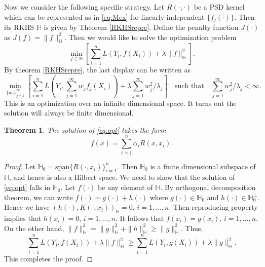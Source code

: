 \documentclass[11pt]{article}
\theoremstyle{plain}
\newtheorem{theorem}{\quad\quad Theorem}
\theoremstyle{definition}
\theoremstyle{remark}
\begin{document}
Now we consider the following specific strategy.
Let $R(\cdot,\cdot)$ be a PSD kernel which can be represented as in \eqref{eq:Mex} for linearly independent $\{f_j(\cdot)\}$.
Then its RKHS $\mathbb H$ is given by Theorem \ref{RKHSrepre}.
Define the penalty function $J(\cdot)$ as $J(f)=\|f\|_{\mathbb H}^2$.
Then we would like to solve the optimization problem
\begin{equation}\label{eq:opt}
    \min_{f\in \mathbb H} \left[
        \sum_{i=1}^n L(Y_i, f(X_i)) + \lambda \|f\|_{\mathbb H}^2
    \right] .
\end{equation}
By theorem \ref{RKHSrepre}, the last display can be written as
\begin{equation*}
    \min_{\{w_j\}_{j=1}^\infty} \left[
        \sum_{i=1}^n L(Y_i, \sum_{j=1}^\infty w_j f_j(X_i)) + \lambda 
\sum_{j=1}^\infty w_j^2/\lambda_j 
    \right] 
    \quad \text{such that}
    \quad 
    \sum_{j=1}^\infty w_j^2/\lambda_j < \infty.
\end{equation*}
This is an optimization over an infinite dimensional space.
It turns out the solution will always be finite dimensional.
\begin{theorem}
    The solution of \eqref{eq:opt} takes the form
    \begin{equation*}
        f(x)=\sum_{i=1}^n \alpha_i R(x,x_i). 
    \end{equation*}
\end{theorem}
\begin{proof}
    Let $\mathbb H_0= \text{span} \{R(\cdot,x_i)\}_{i=1}^n$.
    Then $\mathbb H_0$ is a finite dimensional subspace of $\mathbb H$, and hence is also a Hilbert space.
    We need to show that the solution of \eqref{eq:opt} falls in $\mathbb H_0$.
    Let $f(\cdot)$ be any element of $\mathbb H$.
    By orthogonal decomposition theorem, we can write $f(\cdot)=g(\cdot)+h(\cdot)$ where $g(\cdot)\in \mathbb H_0$ and $h(\cdot)\in \mathbb H_0^\bot$.
    Hence we have
    $(h(\cdot), K(\cdot,x_i))_{\mathbb H}=0$, $i=1,\ldots, n$.
    Then reproducing property implies that
    $h(x_i)=0$, $i=1,\ldots, n$.
    It follows that $f(x_i)=g(x_i)$, $i=1,\ldots, n$.
    On the other hand, $\|f\|^2_{\mathbb H}=\|g\|^2_{\mathbb H}+\|h\|^2_{\mathbb H}\geq \|g\|^2_{\mathbb H}$.
    Thus,
    \begin{equation*}
        \sum_{i=1}^n L(Y_i, f(X_i)) + \lambda \|f\|_{\mathbb H}^2
        \geq
        \sum_{i=1}^n L(Y_i, g(X_i)) + \lambda \|g\|_{\mathbb H}^2.
    \end{equation*}
    This completes the proof.

     
\end{proof}
\end{document}
